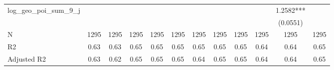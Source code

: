 \begin{table}
\begin{center}
\begin{tabular}{lccccccccccc}
log\_geo\_poi\_sum\_9\_j        &                       &                        &                         &                          &                           &                            &                             &                              &                               & 1.2582***                      &                                  \\
                                &                       &                        &                         &                          &                           &                            &                             &                              &                               & (0.0551)                       &                                  \\
N                               & 1295                  & 1295                   & 1295                    & 1295                     & 1295                      & 1295                       & 1295                        & 1295                         & 1295                          & 1295                           & 1295                             \\
R2                              & 0.63                  & 0.63                   & 0.65                    & 0.65                     & 0.65                      & 0.65                       & 0.65                        & 0.65                         & 0.64                          & 0.64                           & 0.65                             \\
Adjusted R2                     & 0.63                  & 0.62                   & 0.65                    & 0.65                     & 0.65                      & 0.64                       & 0.65                        & 0.65                         & 0.64                          & 0.64                           & 0.65                             \\
\hline
\end{tabular}
\end{center}
\end{table}